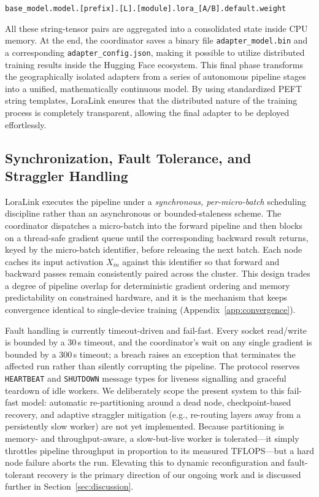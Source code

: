 \documentclass{ieeeaccess}
\begin{document}
\begin{center}
\small\texttt{base\_model.model.[prefix].[L].[module].\allowbreak lora\_[A/B].default.weight}
\end{center}

All these string-tensor pairs are aggregated into a consolidated state inside CPU memory. At the end, the coordinator saves a binary file \texttt{adapter\_model.bin} and a corresponding \texttt{adapter\_config.json}, making it possible to utilize distributed training results inside the Hugging Face ecosystem. This final phase transforms the geographically isolated adapters from a series of autonomous pipeline stages into a unified, mathematically continuous model. By using standardized PEFT string templates, LoraLink ensures that the distributed nature of the training process is completely transparent, allowing the final adapter to be deployed effortlessly.

\subsection{Synchronization, Fault Tolerance, and Straggler Handling}
\label{sec:fault}
LoraLink executes the pipeline under a \emph{synchronous, per-micro-batch} scheduling discipline rather than an asynchronous or bounded-staleness scheme. The coordinator dispatches a micro-batch into the forward pipeline and then blocks on a thread-safe gradient queue until the corresponding backward result returns, keyed by the micro-batch identifier, before releasing the next batch. Each node caches its input activation $X_{in}$ against this identifier so that forward and backward passes remain consistently paired across the cluster. This design trades a degree of pipeline overlap for deterministic gradient ordering and memory predictability on constrained hardware, and it is the mechanism that keeps convergence identical to single-device training (Appendix~\ref{app:convergence}).

Fault handling is currently timeout-driven and fail-fast. Every socket read/write is bounded by a 30\,s timeout, and the coordinator's wait on any single gradient is bounded by a 300\,s timeout; a breach raises an exception that terminates the affected run rather than silently corrupting the pipeline. The protocol reserves \texttt{HEARTBEAT} and \texttt{SHUTDOWN} message types for liveness signalling and graceful teardown of idle workers. We deliberately scope the present system to this fail-fast model: automatic re-partitioning around a dead node, checkpoint-based recovery, and adaptive straggler mitigation (e.g., re-routing layers away from a persistently slow worker) are not yet implemented. Because partitioning is memory- and throughput-aware, a slow-but-live worker is tolerated---it simply throttles pipeline throughput in proportion to its measured TFLOPS---but a hard node failure aborts the run. Elevating this to dynamic reconfiguration and fault-tolerant recovery is the primary direction of our ongoing work and is discussed further in Section~\ref{sec:discussion}.
\end{document}

